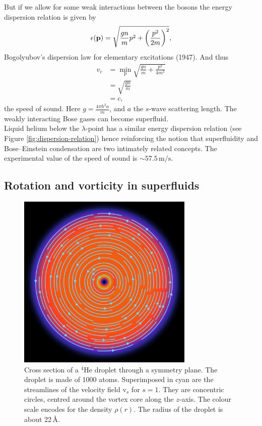 \documentclass[12pt,a4paper]{book}
\renewcommand{\vec}[1]{\bm{\mathrm{#1}}}
\newcommand{\unit}[1]{\,\mathrm{#1}}
\begin{document}
			But if we allow for some weak interactions between the bosons the energy dispersion relation is given by
			\begin{align}
				\epsilon(\vec{p})=\sqrt{\frac{gn}{m}p^2+\qty(\frac{p^2}{2m})^2},
			\end{align}
			Bogolyubov's dispersion law for elementary excitations (1947). And thus
			\begin{align}
				v_c &=\min_{\vec{p}}\sqrt{\frac{gn}{m}+\frac{p^2}{4m^2}} \\
					&= \sqrt{\frac{gn}{m}} \\
					&= c,
			\end{align}
			the speed of sound. Here $g=\frac{4\pi\hbar^2a}{m}$, and $a$ the $s$-wave scattering length. The weakly interacting Bose gases can become superfluid.\\			

			Liquid helium below the $\lambda$-point has a similar energy dispersion relation (see Figure \ref{fig:dispersion-relation}) hence reinforcing the notion that superfluidity and Bose--Einstein condensation are two intimately related concepts. The experimental value of the speed of sound is $\sim\!57.5\unit{m/s}$.
			
		\subsection{Rotation and vorticity in superfluids}\label{sec:rot-vort}
		\begin{figure}[t]
			\begin{center}
				\includegraphics[width=0.75\textwidth]{vortex-xy}
			\end{center}
			\caption{Cross section of a $^4$He droplet through a symmetry plane. The droplet is made of 1000 atoms. Superimposed in cyan are the streamlines of the velocity field $\vec{v}_s$ for $s=1$. They are concentric circles, centred around the vortex core along the $z$-axis. The colour scale encodes for the density $\rho(r)$. The radius of the droplet is about 22\,\AA.}
			\label{fig:vortex-xy}
		\end{figure}
		
\end{document}
